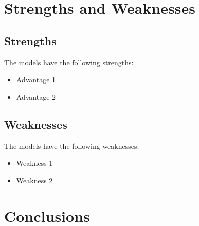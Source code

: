 \documentclass[11pt,a4]{article}
\begin{document}
\section{Strengths and Weaknesses}
\label{Strength_Weakness}


\subsection{Strengths}

The models have the following strengths:

\begin{itemize}
\item Advantage 1

\item Advantage 2
\end{itemize}


\subsection{Weaknesses}

The models have the following weaknesses:

\begin{itemize}
\item Weakness 1

\item Weakness 2
\end{itemize}


\section{Conclusions}
\label{Conclusions}
\end{document}
